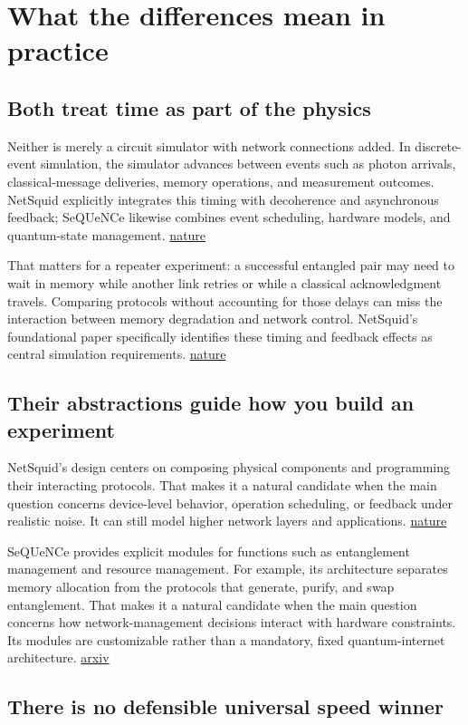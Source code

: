 \documentclass[11pt]{article}
\newcommand{\nature}{\href{https://www.nature.com/articles/s42005-021-00647-8}{nature}}
\newcommand{\arxivseq}{\href{https://arxiv.org/html/2009.12000}{arxiv}}
\begin{document}
\section{What the differences mean in practice}

\subsection{Both treat time as part of the physics}

Neither is merely a circuit simulator with network connections added. In discrete-event simulation, the simulator advances between events such as photon arrivals, classical-message deliveries, memory operations, and measurement outcomes. NetSquid explicitly integrates this timing with decoherence and asynchronous feedback; SeQUeNCe likewise combines event scheduling, hardware models, and quantum-state management. \nature

That matters for a repeater experiment: a successful entangled pair may need to wait in memory while another link retries or while a classical acknowledgment travels. Comparing protocols without accounting for those delays can miss the interaction between memory degradation and network control. NetSquid's foundational paper specifically identifies these timing and feedback effects as central simulation requirements. \nature

\subsection{Their abstractions guide how you build an experiment}

NetSquid's design centers on composing physical components and programming their interacting protocols. That makes it a natural candidate when the main question concerns device-level behavior, operation scheduling, or feedback under realistic noise. It can still model higher network layers and applications. \nature

SeQUeNCe provides explicit modules for functions such as entanglement management and resource management. For example, its architecture separates memory allocation from the protocols that generate, purify, and swap entanglement. That makes it a natural candidate when the main question concerns how network-management decisions interact with hardware constraints. Its modules are customizable rather than a mandatory, fixed quantum-internet architecture. \arxivseq

\subsection{There is no defensible universal speed winner}
\end{document}
